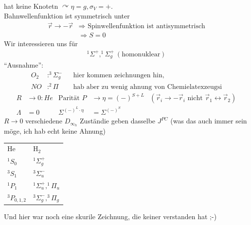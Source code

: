 hat keine Knotetn $\curvearrowright \eta = g, \sigma_V = +$.
\\
Bahnwellenfunktion ist symmetrisch unter
	\begin{align*}
		\vec{r} \rightarrow - \vec{r} &\Rightarrow \text{ Spinwellenfunktion ist antisymmetrisch}\\
		&\Rightarrow S = 0
	\end{align*}
Wir interessieren uns für 	
	\begin{align*}
		^1\Sigma^+, ^1\Sigma^+_g ~(\text{homonuklear})
	\end{align*}
``Ausnahme'':
	\begin{align*}
		O_2 &: ^3\Sigma^-_g & &\text{hier kommen zeichnungen hin, }\\
		NO &: ^2\Pi & &\text{hab aber zu wenig ahnung von Chemielatexzeugsi}
	\end{align*}
	\begin{align*}
		R &\rightarrow 0 : He &\text{Parität } P &\rightarrow \eta = (-)^{S + L}
		&(\vec{r}_i \rightarrow -\vec{r}_i \text{ nicht } \vec{r}_1 \leftrightarrow \vec{r}_2) \\
		\Lambda &= 0 &\Sigma^{(-)^L \cdot \eta} &= \Sigma^{(-)^S}
	\end{align*}
$R \rightarrow 0$ verschiedene $D_{\infty_h}$ Zuständie geben dasselbe $J^{PC}$ (was das auch immer sein möge, ich hab echt keine Ahnung)

	\begin{tabular}{l l}
		He & H$_2$ \\
		$^1S_0$ & $^1\Sigma^+_g$ \\
		$^3S_1$ & $^3\Sigma^-_u$ \\
		$^1P_1$ & $^1\Sigma^+_u, ^1\Pi_u$\\
		$^3P_{0,1,2}$ & $^3\Sigma^-_g, ^3\Pi_g$\\
	\end{tabular}
	
Und hier war noch eine skurile Zeichnung, die keiner verstanden hat ;-)\\

